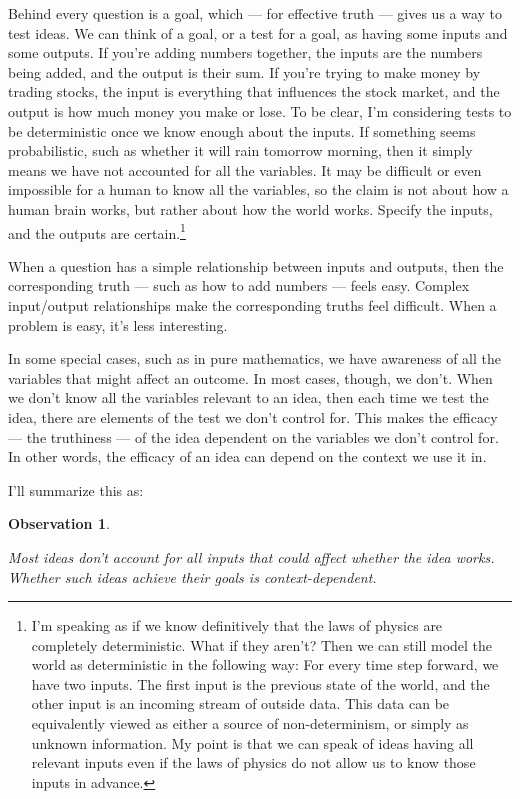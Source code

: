 \documentclass[9pt, twoside]{book}
\newtheorem{obs}{Observation}
\theoremstyle{argtstyle}
\begin{document}
Behind every question is a goal, which --- for effective truth --- gives
us a way to test ideas.
We can think of a goal, or a test for a goal, as having some inputs
and some outputs.
If you're adding numbers together,
the inputs are the numbers being added, and
the output is their sum.
If you're trying to make money by trading stocks,
the input is everything
that influences the stock market,
and the output is how much
money you make or lose.
To be clear, I'm considering tests to be deterministic once we know enough
about the inputs.
If something seems probabilistic,
such as whether it will
rain tomorrow morning, then it simply means we have not accounted for all
the variables.
It may be difficult or even impossible for a human to know all
the variables, so the claim is not about how a human brain works, but rather
about how the world works.
Specify the inputs, and the outputs are certain.\footnote{I'm speaking as if we
know definitively that the laws of physics are completely deterministic. What if
they aren't? Then we can still model the world as deterministic in the following
way: For every time step forward, we have two inputs. The first input is the
previous state of the world, and the other input is an incoming stream of
outside data. This data can be equivalently viewed as either a source of
non-determinism, or simply as unknown information. My point is that we can speak
of
ideas having all relevant inputs even if the laws of physics do not allow us to
know those inputs in advance.}

When a question has a simple relationship between inputs and outputs, then the
corresponding truth --- such as how to add numbers --- feels easy. Complex
input/output relationships make the corresponding truths feel difficult.
When a problem is easy, it's less interesting.

In some special cases, such as in pure mathematics,
we have awareness of all the variables that might affect an outcome.
In most cases, though, we don't.
When we don't know all the variables relevant to an idea, then each time we
test the idea, there are elements of the test we don't control for.
This makes the efficacy --- the truthiness --- of the idea dependent on the
variables we don't control for. In other words, the efficacy of an idea
can depend on the context we use it in.

I'll summarize this as:
\newcommand{\obssix}{
    Most ideas don't account for all inputs that could affect
    whether the idea works.
    Whether such ideas achieve their goals is context-dependent.
}
\begin{obs}\label{o6}
    \obssix
\end{obs}
\end{document}
